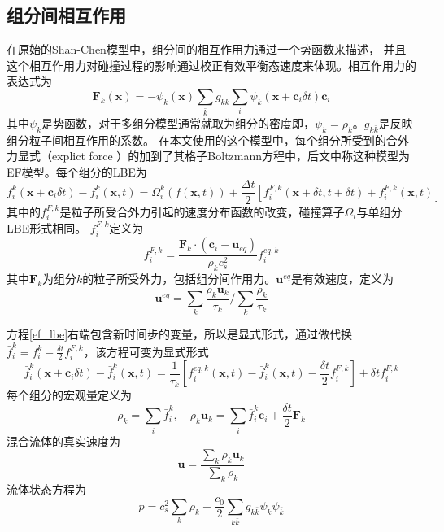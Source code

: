\subsection{组分间相互作用}
在原始的Shan-Chen模型中，组分间的相互作用力通过一个势函数来描述，
并且这个相互作用力对碰撞过程的影响通过校正有效平衡态速度来体现。相互作用力的表达式为
\begin{equation}
\bm F_k(\bm x) = -\psi_k(\bm x)\sum_{\bar k}g_{k\bar k}\sum_i\psi_{\bar k}(\bm x+\bm c_i\delta t)\bm c_i
\label{sc_force}
\end{equation}
其中$\psi_k$是势函数，对于多组分模型通常就取为组分的密度即，$\psi_k = \rho_k$。$g_{k{\bar k}}$是反映
组分粒子间相互作用的系数。
在本文使用的这个模型中，每个组分所受到的合外力显式（explict force ）的加到了其格子Boltzmann方程中，后文中称这种模型为EF模型。每个组分的LBE为
\begin{equation}
f_i^k(\bm x + \bm c_i\delta t) - f_i^k(\bm x, t)=\Omega_i^k(f(\bm x, t))+\frac{\Delta t}{2}
\left[ f_i^{F,k}(\bm x+\delta t, t+\delta t)+ f_i^{F,k}(\bm x, t)\right]
\label{ef_lbe}
\end{equation}
其中的$f_i^{F,k}$是粒子所受合外力引起的速度分布函数的改变，碰撞算子$\Omega_i$与单组分LBE形式相同。
$f_i^{F,k}$定义为
\begin{equation}
f_i^{F,k}=\frac{\bm F_k \cdot(\bm c_i - \bm u_{eq})}{\rho_k c_s^2}f_i^{eq,k}
\end{equation}
其中$\bm F_k$为组分$k$的粒子所受外力，包括组分间作用力。$\bm u^{eq}$是有效速度，定义为
\begin{equation}
\bm u^{eq} =  \sum_k\frac{\rho_k \bm u_k}{\tau_k}/\sum_k\frac{\rho_k}{\tau_k}
\end{equation}

方程\eqref{ef_lbe}右端包含新时间步的变量，所以是显式形式，通过做代换
$\bar f_i^k=f_i^k -\frac{\delta t}{2}f_i^{F,k}$，该方程可变为显式形式
\begin{equation}
\bar f_i^k(\bm x + \bm c_i\delta t) - \bar f_i^k(\bm x, t) 
=\frac{1}{\tau_k}\left[f_i^{eq,k}(\bm x, t) - \bar f_i^k(\bm x, t) - \frac{\delta t}{2}f_i^{F,k}\right]
+\delta t f_i^{F,k}
\end{equation}
每个组分的宏观量定义为
\begin{equation}
\rho_k = \sum_i\bar f_i^k, \quad \rho_k \bm u_k = \sum_i \bar f_i^k \bm c_i + \frac{\delta t}{2}\bm F_k
\end{equation}
混合流体的真实速度为
\begin{equation}
\bm u =\frac{\sum\nolimits_k\rho_k\bm u_k}{\sum\nolimits_k\rho_k}
\end{equation}
流体状态方程为
\begin{equation}
  p=c_s^2 \sum_k\rho_k + \frac{c_0}{2}\sum_{k\bar k}g_{k\bar k}\psi_k\psi_{\bar k}
  \label{EOS}
\end{equation}

